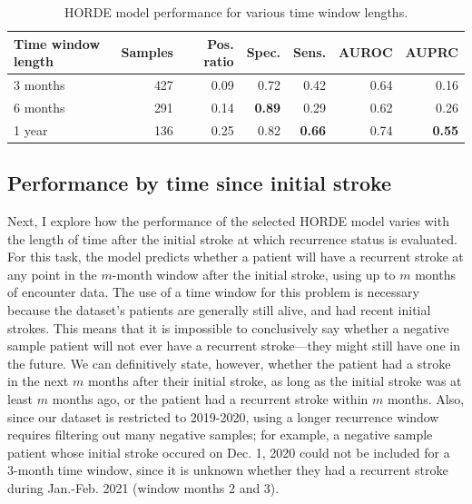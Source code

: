 \documentclass{article}
\begin{document}
\begin{table}
    \caption{
      HORDE model performance for various time window lengths.
    }
    \label{tab:exp}
    \centering
    \centering
    \label{tab:exp-synth}
    \begin{small}
    \begin{sc}
    \begin{tabular}{lrrrrrr}
    \toprule
    Time window length & Samples & Pos. ratio & Spec. & Sens. & AUROC & AUPRC \\
    \midrule
    3 months & 427 & 0.09 & 0.72 & 0.42 & 0.64 & 0.16 \\
    6 months & 291 & 0.14 & \textbf{0.89} & 0.29 & 0.62 & 0.26 \\
    1 year & 136 & 0.25 & 0.82 & \textbf{0.66} & 0.74 & \textbf{0.55} \\
    \bottomrule
    \end{tabular}
    \end{sc}
    \end{small}

\end{table}



\subsection{Performance by time since initial stroke}

Next, I explore how the performance of the selected HORDE model varies with the length of time after the initial stroke at which recurrence status is evaluated. For this task, the model predicts whether a patient will have a recurrent stroke at any point in the $m$-month window after the initial stroke, using up to $m$ months of encounter data. The use of a time window for this problem is necessary because the dataset's patients are generally still alive, and had recent initial strokes. This means that it is impossible to conclusively say whether a negative sample patient will not ever have a recurrent stroke---they might still have one in the future. We can definitively state, however, whether the patient had a stroke in the next $m$ months after their initial stroke, as long as the initial stroke was at least $m$ months ago, or the patient had a recurrent stroke within $m$ months. Also, since our dataset is restricted to 2019-2020, using a longer recurrence window requires filtering out many negative samples; for example, a negative sample patient whose initial stroke occured on Dec. 1, 2020 could not be included for a 3-month time window, since it is unknown whether they had a recurrent stroke during Jan.-Feb. 2021 (window months 2 and 3).
\end{document}
